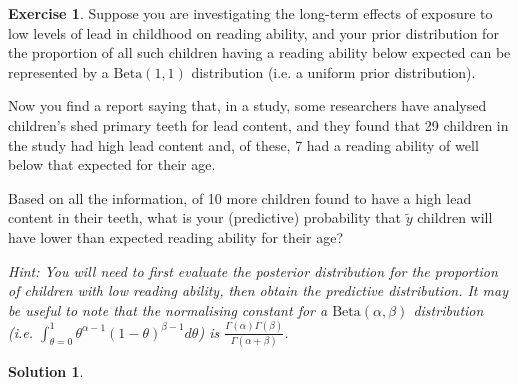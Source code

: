 \documentclass{article}
\theoremstyle{plain}
\theoremstyle{definition}
\newtheorem{exercise}{Exercise}
\newtheorem*{sol*}{Solution}
\begin{document}
\newpage
\begin{exercise}
Suppose you are investigating the long-term effects of exposure to low
levels of lead in childhood on reading ability, and your prior distribution
for the proportion of all such children having a reading ability below
expected can be represented by a $\mathrm{Beta}(1, 1)$ distribution (i.e. a uniform
prior distribution).

Now you find a report saying that, in a study, some researchers have
analysed children’s shed primary teeth for lead content, and they found
that 29 children in the study had high lead content and, of these, 7 had
a reading ability of well below that expected for their age.

Based on all the information, of 10 more children found to have a high
lead content in their teeth, what is your (predictive) probability that $\tilde{y}$ children will have lower than expected reading ability for their age?

\emph{Hint: You will need to first evaluate the posterior distribution for the
proportion of children with low reading ability, then obtain the predictive
distribution. It may be useful to note that the normalising constant for
a $\mathrm{Beta}(\alpha, \beta)$ distribution (i.e. $\int^1_{\theta=0} \theta^{\alpha - 1}(1 - \theta)^{\beta - 1}d\theta$) is $\frac{\Gamma(\alpha)\Gamma(\beta)}{\Gamma(\alpha+\beta)}$.}
\end{exercise}
\begin{sol*}

\end{sol*}
\end{document}
